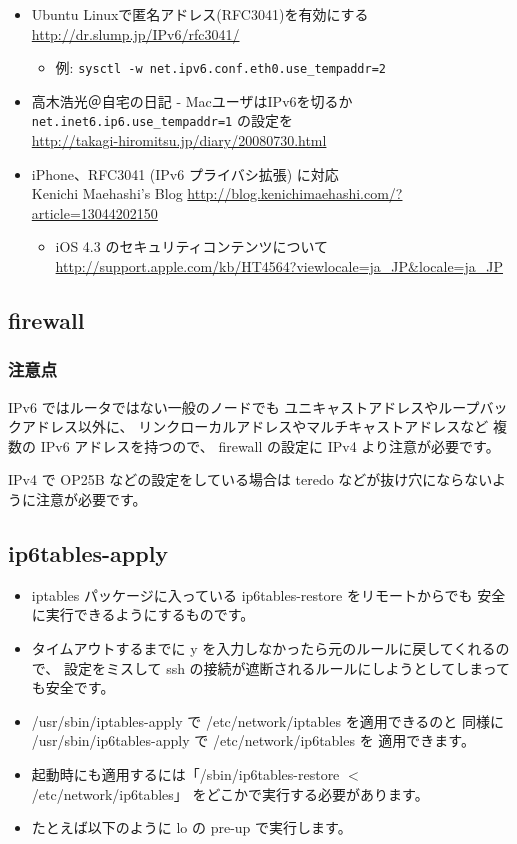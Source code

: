 \documentclass[mingoth,a4paper]{jsarticle}
\begin{document}
\begin{itemize}
\item Ubuntu Linuxで匿名アドレス(RFC3041)を有効にする \url{http://dr.slump.jp/IPv6/rfc3041/}

\begin{itemize}
\item 例: \texttt{sysctl -w net.ipv6.conf.eth0.use\_tempaddr=2}
\end{itemize}
\item 高木浩光＠自宅の日記 - MacユーザはIPv6を切るか \texttt{net.inet6.ip6.use\_tempaddr=1} の設定を \\
  \url{http://takagi-hiromitsu.jp/diary/20080730.html}
\item iPhone、RFC3041 (IPv6 プライバシ拡張) に対応\\
  Kenichi Maehashi's Blog \url{http://blog.kenichimaehashi.com/?article=13044202150}
\begin{itemize}
\item iOS 4.3 のセキュリティコンテンツについて\\
  \url{http://support.apple.com/kb/HT4564?viewlocale=ja_JP&locale=ja_JP}
\end{itemize}

\end{itemize}
\subsection{firewall}

\subsubsection{注意点}


IPv6 ではルータではない一般のノードでも
ユニキャストアドレスやループバックアドレス以外に、
リンクローカルアドレスやマルチキャストアドレスなど
複数の IPv6 アドレスを持つので、
firewall の設定に IPv4 より注意が必要です。

IPv4 で OP25B などの設定をしている場合は
teredo などが抜け穴にならないように注意が必要です。
\subsection{ip6tables-apply}

\begin{itemize}
\item iptables パッケージに入っている ip6tables-restore をリモートからでも
  安全に実行できるようにするものです。
\item タイムアウトするまでに y を入力しなかったら元のルールに戻してくれるので、
  設定をミスして ssh の接続が遮断されるルールにしようとしてしまっても安全です。
\item /usr/sbin/iptables-apply で /etc/network/iptables を適用できるのと
  同様に /usr/sbin/ip6tables-apply で /etc/network/ip6tables を
  適用できます。
\item 起動時にも適用するには「/sbin/ip6tables-restore $<$ /etc/network/ip6tables」
  をどこかで実行する必要があります。
\item たとえば以下のように lo の pre-up で実行します。
\end{itemize}
\end{document}
